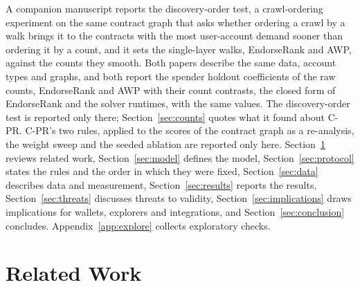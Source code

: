 \documentclass{ieeeaccess}
\newcommand{\cpr}{\mbox{C-PR}}
\begin{document}
A companion manuscript \cite{kwon2026companion} reports the discovery-order test, a crawl-ordering experiment on the same contract graph that asks whether ordering a crawl by a walk brings it to the contracts with the most user-account demand sooner than ordering it by a count, and it sets the single-layer walks, EndorseRank and AWP, against the counts they smooth. Both papers describe the same data, account types and graphs, and both report the spender holdout coefficients of the raw counts, EndorseRank and AWP with their count contrasts, the closed form of EndorseRank and the solver runtimes, with the same values. The discovery-order test is reported only there; Section~\ref{sec:counts} quotes what it found about \cpr{}. \cpr{}'s two rules, applied to the scores of the contract graph as a re-analysis, the weight sweep and the seeded ablation are reported only here. Section~\ref{sec:related} reviews related work, Section~\ref{sec:model} defines the model, Section~\ref{sec:protocol} states the rules and the order in which they were fixed, Section~\ref{sec:data} describes data and measurement, Section~\ref{sec:results} reports the results, Section~\ref{sec:threats} discusses threats to validity, Section~\ref{sec:implications} draws implications for wallets, explorers and integrations, and Section~\ref{sec:conclusion} concludes. Appendix~\ref{app:explore} collects exploratory checks.

\section{Related Work}
\label{sec:related}
\end{document}
